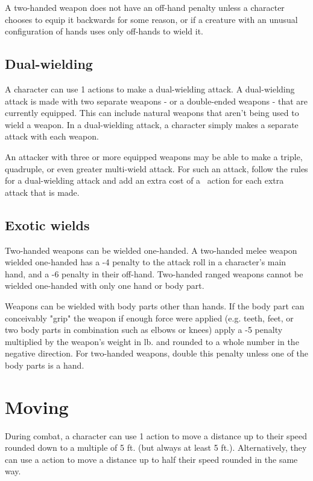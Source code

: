 \begin{multicols*}{2}
    A two-handed weapon does not have an off-hand penalty unless a character
    chooses to equip it backwards for some reason, or if a creature with an
    unusual configuration of hands uses only off-hands to wield it.

    \subsection{Dual-wielding}\label{combat:dual-wielding}
    A character can use 1 {\textonehalf} actions to make a dual-wielding
    attack. A dual-wielding attack is made with two separate weapons - or a
    double-ended weapons - that are currently equipped. This can include
    natural weapons that aren't being used to wield a weapon. In a
    dual-wielding attack, a character simply makes a separate attack with each
    weapon.

    An attacker with three or more equipped weapons may be able to make a
    triple, quadruple, or even greater multi-wield attack. For such an attack,
    follow the rules for a dual-wielding attack and add an extra cost of a
    \textonehalf\ action for each extra attack that is made.

    \subsection{Exotic wields}
    Two-handed weapons can be wielded one-handed. A two-handed melee weapon
    wielded one-handed has a -4 penalty to the attack roll in a character's
    main hand, and a -6 penalty in their off-hand. Two-handed ranged weapons
    cannot be wielded one-handed with only one hand or body part.

    Weapons can be wielded with body parts other than hands. If the body part
    can conceivably "grip" the weapon if enough force were applied (e.g. teeth,
    feet, or two body parts in combination such as elbows or knees) apply a -5
    penalty multiplied by the weapon's weight in lb. and rounded to a whole
    number in the negative direction. For two-handed weapons, double this
    penalty unless one of the body parts is a hand.

    \section{Moving}\label{combat:moving}
    During combat, a character can use 1 action to move a distance up to their
    speed rounded down to a multiple of 5 ft. (but always at least 5 ft.).
    Alternatively, they can use a {\textonehalf} action to move a distance up
    to half their speed rounded in the same way.


\end{multicols*}
